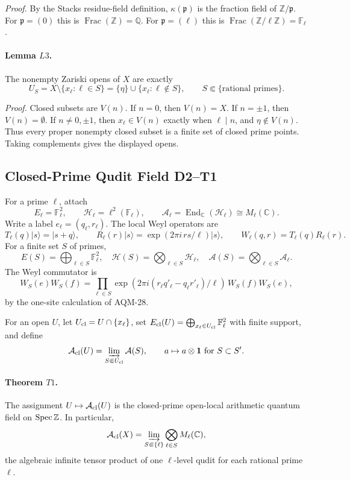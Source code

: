 \emph{Proof.}
By the Stacks residue-field definition,
\(\kappa(\mathfrak p)\) is the fraction field of
\(\mathbb Z/\mathfrak p\).  For \(\mathfrak p=(0)\) this is
\(\operatorname{Frac}(\mathbb Z)=\mathbb Q\).  For
\(\mathfrak p=(\ell)\) this is
\(\operatorname{Frac}(\mathbb Z/\ell\mathbb Z)=\mathbb F_\ell\).

\paragraph{Lemma \(L3\).}
The nonempty Zariski opens of \(X\) are exactly
\[
  U_S=X\setminus\{x_\ell:\ell\in S\}
     =\{\eta\}\cup\{x_\ell:\ell\notin S\},
  \qquad S\Subset\{\text{rational primes}\}.
\]

\emph{Proof.}
Closed subsets are \(V(n)\).  If \(n=0\), then \(V(n)=X\).  If \(n=\pm1\),
then \(V(n)=\emptyset\).  If \(n\ne0,\pm1\), then \(x_\ell\in V(n)\) exactly
when \(\ell\mid n\), and \(\eta\notin V(n)\).  Thus every proper nonempty
closed subset is a finite set of closed prime points.  Taking complements gives
the displayed opens.

\subsection{Closed-Prime Qudit Field D2--T1}
For a prime \(\ell\), attach
\[
  E_\ell=\mathbb F_\ell^2,\qquad
  \mathcal H_\ell=\ell^2(\mathbb F_\ell),\qquad
  \mathcal A_\ell=\operatorname{End}_{\mathbb C}(\mathcal H_\ell)\cong M_\ell(\mathbb C).
\]
Write a label \(e_\ell=(q_\ell,r_\ell)\).  The local Weyl operators are
\[
  T_\ell(q)|s\rangle=|s+q\rangle,\qquad
  R_\ell(r)|s\rangle=\exp(2\pi i\,rs/\ell)|s\rangle,\qquad
  W_\ell(q,r)=T_\ell(q)R_\ell(r).
\]
For a finite set \(S\) of primes,
\[
  E(S)=\bigoplus_{\ell\in S}\mathbb F_\ell^2,\quad
  \mathcal H(S)=\bigotimes_{\ell\in S}\mathcal H_\ell,\quad
  \mathcal A(S)=\bigotimes_{\ell\in S}\mathcal A_\ell .
\]
The Weyl commutator is
\[
  W_S(e)W_S(f)=
  \prod_{\ell\in S}\exp(2\pi i(r_\ell q'_\ell-q_\ell r'_\ell)/\ell)\,
  W_S(f)W_S(e),
\]
by the one-site calculation of AQM-28.

For an open \(U\), let \(U_{\rm cl}=U\cap\{x_\ell\}\), set
\(E_{\rm cl}(U)=\bigoplus_{x_\ell\in U_{\rm cl}}\mathbb F_\ell^2\) with finite
support, and define
\[
  \mathcal A_{\rm cl}(U)=
  \varinjlim_{S\Subset U_{\rm cl}}\mathcal A(S),
  \qquad a\mapsto a\otimes\mathbf 1\text{ for }S\subset S'.
\]

\paragraph{Theorem \(T1\).}
The assignment \(U\mapsto\mathcal A_{\rm cl}(U)\) is the closed-prime
open-local arithmetic quantum field on \(\operatorname{Spec}\mathbb Z\).  In particular,
\[
  \mathcal A_{\rm cl}(X)=
  \varinjlim_{S\Subset\{\ell\}}\bigotimes_{\ell\in S}M_\ell(\mathbb C),
\]
the algebraic infinite tensor product of one \(\ell\)-level qudit for each
rational prime \(\ell\).

